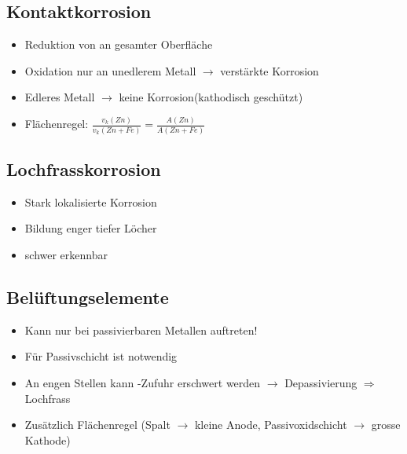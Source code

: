 \subsection{Kontaktkorrosion}
    \begin{itemize}
        \item Reduktion von  an gesamter Oberfläche
        \item Oxidation nur an unedlerem Metall $\rightarrow$ verstärkte Korrosion
        \item Edleres Metall $\rightarrow$ keine Korrosion(kathodisch geschützt)
        \item Flächenregel: $\frac{v_k(Zn)}{v_k(Zn + Fe)} = \frac{A(Zn)}{A(Zn + Fe)}$
    \end{itemize}

\subsection{Lochfrasskorrosion}
    \begin{itemize}
        \item Stark lokalisierte Korrosion
        \item Bildung enger tiefer Löcher
        \item schwer erkennbar
    \end{itemize}

\subsection{Belüftungselemente}
    \begin{itemize}
        \item Kann nur bei passivierbaren Metallen auftreten!
        \item Für Passivschicht ist  notwendig
        \item An engen Stellen kann -Zufuhr erschwert werden $\rightarrow$ Depassivierung $\Rightarrow$ Lochfrass
        \item Zusätzlich Flächenregel (Spalt $\rightarrow$ kleine Anode, Passivoxidschicht $\rightarrow$ grosse Kathode)
    \end{itemize}

